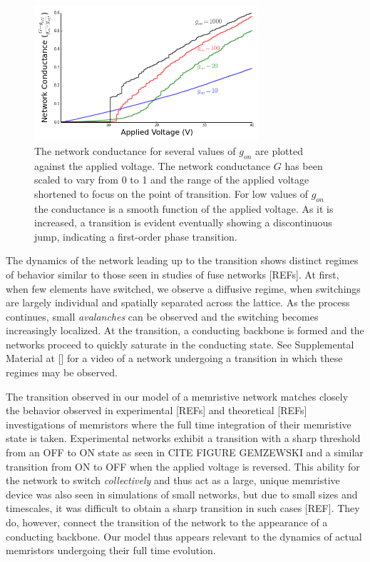 \documentclass[aps,prl,reprint,groupedaddress]{revtex4-1}
\begin{document}
\begin{figure}
\includegraphics[width=8.3cm]{PT_Networks_Conductances.png}
\caption{The network conductance for several values of $g_{on}$ are plotted
against the applied voltage.  The network conductance $G$ has been scaled to
vary from 0 to 1 and the range of the applied voltage shortened to focus on
the point of transition. For low values of $g_{on}$ the conductance is a
smooth function of the applied voltage.  As it is increased, a transition is
evident eventually showing a discontinuous jump, indicating a first-order 
phase transition.\label{Cond_fig}}
\end{figure}

The dynamics of the network leading up to the transition shows 
distinct regimes of behavior similar to those seen in studies of fuse
networks [REFs]. At first, when few elements have switched,
we observe a diffusive regime, when switchings are largely individual and
spatially separated across the lattice.  As the process continues,
small {\it avalanches} can be observed and the switching becomes increasingly
localized.  At the transition, a conducting backbone is formed and the
networks proceed to quickly saturate in the conducting state. See
Supplemental Material at [] for a video of a network undergoing a transition
in which these regimes may be observed. 

The transition observed in our model of a memristive network
matches closely the behavior observed  in experimental [REFs] and theoretical [REFs] investigations of
memristors where the full time integration of their memristive state is taken.  Experimental networks exhibit a transition with a sharp
threshold from an OFF to ON state as seen in CITE FIGURE GEMZEWSKI and a
similar transition from ON to OFF when the applied voltage is reversed.
This ability for the network to switch {\it collectively} and thus act as a large, unique 
memristive device was also seen in simulations of small networks, but due to
small sizes and timescales, it was difficult to obtain a sharp transition in such cases [REF].
They do, however, connect the transition of the network to the appearance of
a conducting backbone.  Our model thus appears relevant to the
dynamics of actual memristors undergoing their full time evolution. 
\end{document}

